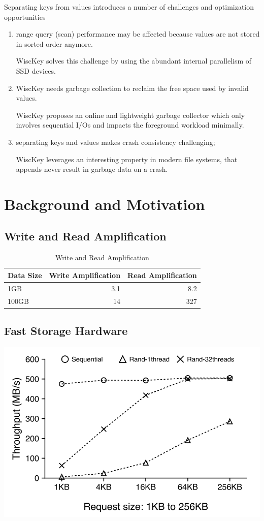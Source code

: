 \documentclass[11pt]{article}
\begin{document}
Separating keys from values introduces a number of challenges and optimization opportunities
\begin{enumerate}
\item range query (scan) performance may be affected because values are not stored in sorted order
anymore.

WiscKey solves this challenge by using the abundant internal parallelism of SSD devices.

\item WiscKey needs garbage collection to reclaim the free space used by invalid values.

WiscKey proposes an online and lightweight garbage collector which only involves sequential I/Os
and impacts the foreground workload minimally.
\item separating keys and values makes crash consistency challenging;

WiscKey leverages an interesting property in modern ﬁle systems, that appends never result in
garbage data on a crash.
\end{enumerate}
\section{Background and Motivation}
\label{sec:org44d50cc}
\subsection{Write and Read Amplification}
\label{sec:orgff64b7d}
\begin{table}[htbp]
\caption{Write and Read Amplification}
\centering
\begin{tabular}{lrr}
Data Size & Write Amplification & Read Amplification\\
\hline
1GB & 3.1 & 8.2\\
100GB & 14 & 327\\
\end{tabular}
\end{table}
\subsection{Fast Storage Hardware}
\label{sec:org05b012c}
\begin{center}
\includegraphics[width=.7\textwidth]{../../images/db/15.png}
\end{center}
\end{document}
